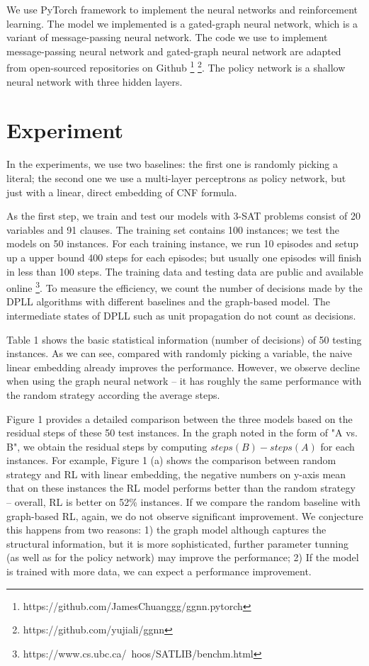 \documentclass[sigplan,10pt]{acmart}\settopmatter{printfolios=true,printccs=false,printacmref=false}
\begin{document}
We use PyTorch framework to implement the neural networks and reinforcement learning.
The model we implemented is a gated-graph neural network, which is a variant of message-passing neural network.
The code we use to implement message-passing neural network and gated-graph neural network 
are adapted from open-sourced repositories on Github 
\footnote{https://github.com/JamesChuanggg/ggnn.pytorch} 
\footnote{https://github.com/yujiali/ggnn}.
The policy network is a shallow neural network with three hidden layers.

\section{Experiment}

In the experiments, we use two baselines: the first one is randomly picking a literal; 
the second one we use a multi-layer perceptrons as policy network, but just with 
a linear, direct embedding of CNF formula.

As the first step, we train and test our models with 3-SAT problems consist of 
20 variables and 91 clauses. The training set contains 100 instances; we test
the models on 50 instances. For each training instance, we run 10 episodes and 
setup up a upper bound 400 steps for each episodes; but usually one episodes 
will finish in less than 100 steps.
The training data and testing data are public and available online 
\footnote{https://www.cs.ubc.ca/~hoos/SATLIB/benchm.html}.
To measure the efficiency, we count the number of decisions made by the DPLL algorithms 
with different baselines and the graph-based model. 
The intermediate states of DPLL such as unit propagation do not count as decisions.

Table 1 shows the basic statistical information (number of decisions) of 50 testing instances.
As we can see, compared with randomly picking a variable, 
the naive linear embedding already improves the performance.
However, we observe decline when using the graph neural network -- it has roughly the same
performance with the random strategy according the average steps.

Figure 1 provides a detailed comparison between the three models based on the residual 
steps of these 50 test instances. In the graph noted in the form of "A vs. B", we obtain
the residual steps by computing $steps(B) - steps(A)$ for each instances.
For example, Figure 1 (a) shows the comparison between random strategy and RL with linear 
embedding, the negative numbers on y-axis mean that on these instances the RL model performs
better than the random strategy -- overall, RL is better on 52\% instances.
If we compare the random baseline with graph-based RL, again, we do not observe
significant improvement. We conjecture this happens from two reasons: 
1) the graph model although captures the structural information, but it is more 
sophisticated, further parameter tunning (as well as for the policy network) 
may improve the performance;
2) If the model is trained with more data, we can expect a performance improvement.
\end{document}
